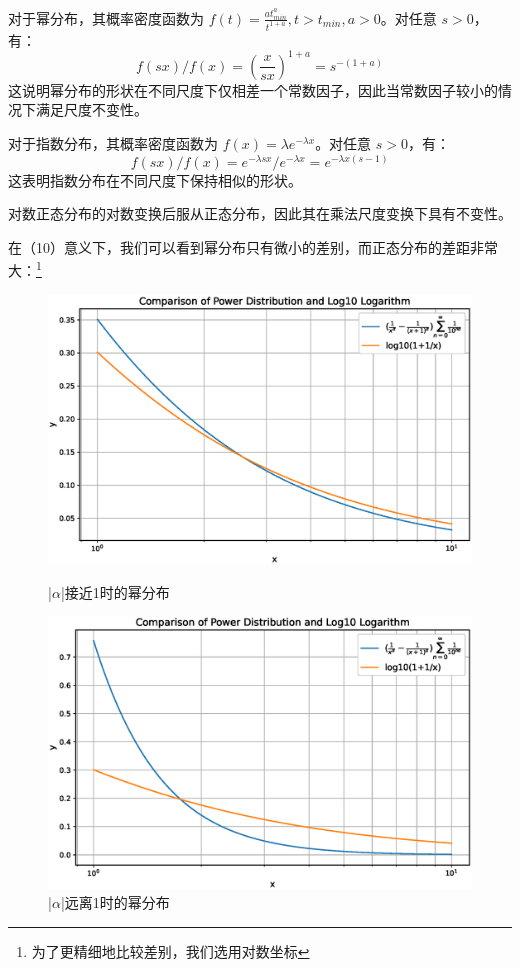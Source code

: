 \documentclass{ctexart} %
\begin{document}
对于幂分布，其概率密度函数为 $f(t)=\frac{at_{min}^a}{t^{1+a}}, t>t_{min}, a>0$。对任意 $s>0$，有：
\[ f(sx)/f(x) = (\frac{x}{sx})^{1+a} = s^{-(1+a)} \]
这说明幂分布的形状在不同尺度下仅相差一个常数因子，因此当常数因子较小的情况下满足尺度不变性。

对于指数分布，其概率密度函数为 $f(x)=\lambda e^{-\lambda x}$。对任意 $s>0$，有：
\[ f(sx)/f(x) = e^{-\lambda sx}/e^{-\lambda x} = e^{-\lambda x(s-1)} \]
这表明指数分布在不同尺度下保持相似的形状。

对数正态分布的对数变换后服从正态分布，因此其在乘法尺度变换下具有不变性。

在（10）意义下，我们可以看到幂分布只有微小的差别，而正态分布的差距非常大：\footnote{为了更精细地比较差别，我们选用对数坐标}
\begin{figure}[H]
    \begin{minipage}{0.48\textwidth}
        \includegraphics[width=\textwidth]{power1.eps}
        \caption{|$\alpha$|接近1时的幂分布}
    \end{minipage}
    \hfill
    \begin{minipage}{0.48\textwidth}
        \includegraphics[width=\textwidth]{power2.eps}
        \caption{|$\alpha$|远离1时的幂分布}
    \end{minipage}
\end{figure}
\end{document}
